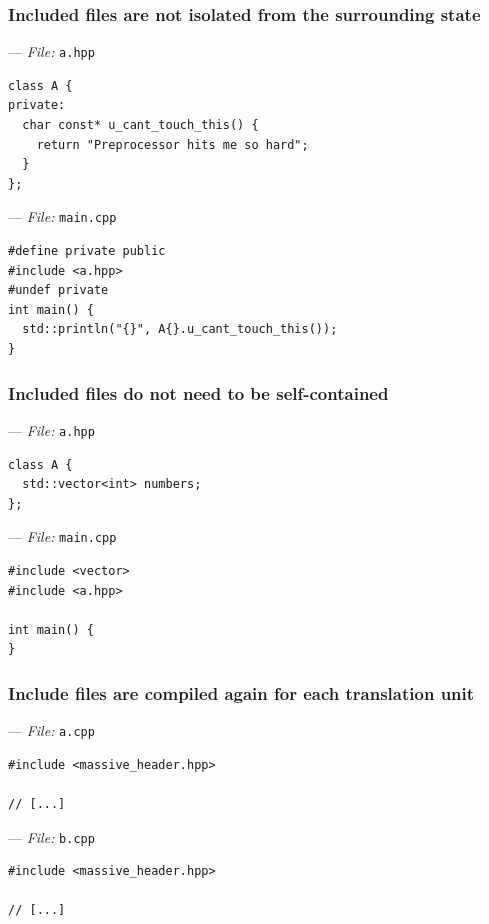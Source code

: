 \documentclass[aspectratio=169]{beamer}
\newif\iftransitions
\newcommand{\cpause}{\iftransitions \pause \fi}
\begin{document}
\begin{frame}[fragile]
  \frametitle{Included files are not isolated from the surrounding state}

  --- \textit{File:} \texttt{a.hpp}
  \begin{lstlisting}[style=cpp20]
class A {
private:
  char const* u_cant_touch_this() {
    return "Preprocessor hits me so hard";
  }
};
  \end{lstlisting}
  \cpause
  --- \textit{File:} \texttt{main.cpp}
  \begin{lstlisting}[style=cpp20]
#define private public
#include <a.hpp>
#undef private
int main() {
  std::println("{}", A{}.u_cant_touch_this());
}
  \end{lstlisting}

\end{frame}

\begin{frame}[fragile]
  \frametitle{Included files do not need to be self-contained}

  --- \textit{File:} \texttt{a.hpp}
  \begin{lstlisting}[style=cpp20]
class A {
  std::vector<int> numbers;
};
  \end{lstlisting}

  --- \textit{File:} \texttt{main.cpp}
  \begin{lstlisting}[style=cpp20]
#include <vector>
#include <a.hpp>

int main() {
}
  \end{lstlisting}

\end{frame}

\begin{frame}[fragile]
  \frametitle{Include files are compiled again for each translation unit}

    --- \textit{File:} \texttt{a.cpp}
  \begin{lstlisting}[style=cpp20]
#include <massive_header.hpp>

// [...]
  \end{lstlisting}

  --- \textit{File:} \texttt{b.cpp}
  \begin{lstlisting}[style=cpp20]
#include <massive_header.hpp>

// [...]
  \end{lstlisting}

\end{frame}
\end{document}
